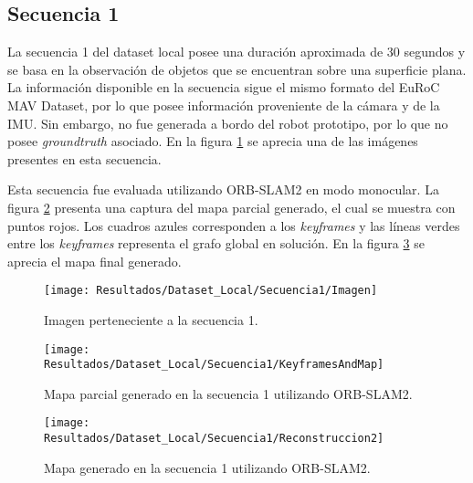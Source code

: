 \subsection{Secuencia 1}

La secuencia 1 del dataset local posee una duración aproximada de 30 segundos y se basa en la observación de objetos  que se encuentran sobre una superficie plana. La información disponible en la secuencia sigue el mismo formato del EuRoC MAV Dataset, por lo que posee información proveniente de la cámara y de la IMU. Sin embargo, no fue generada a bordo del robot prototipo, por lo que no posee \textit{groundtruth} asociado. En la figura \ref{imagen:Resultados/Dataset_Local/Secuencia1/Imagen} se aprecia una de las imágenes presentes en esta secuencia.

Esta secuencia fue evaluada utilizando ORB-SLAM2 en modo monocular. La figura \ref{imagen:Resultados/Dataset_Local/Secuencia1/KeyframesAndMap} presenta una captura del mapa parcial generado, el cual se muestra con puntos rojos. Los cuadros azules corresponden a los \textit{keyframes} y las líneas verdes entre los \textit{keyframes} representa el grafo global en solución. En la figura \ref{imagen:Resultados/Dataset_Local/Secuencia1/Reconstruccion2} se aprecia el mapa final generado.

 
\begin{figure}[H]
	\centering
	\texttt{[image: Resultados/Dataset\_Local/Secuencia1/Imagen]}
	\caption[Imagen perteneciente a la secuencia 1 del dataset local]{Imagen perteneciente a la secuencia 1.}
	\label{imagen:Resultados/Dataset_Local/Secuencia1/Imagen}
\end{figure}


\begin{figure}[H]
	\centering
	\texttt{[image: Resultados/Dataset\_Local/Secuencia1/KeyframesAndMap]}
	\caption[Mapa parcial generado en la secuencia 1 utilizando ORB-SLAM2]{Mapa parcial generado en la secuencia 1 utilizando ORB-SLAM2.}
	\label{imagen:Resultados/Dataset_Local/Secuencia1/KeyframesAndMap}
\end{figure}

\begin{figure}[H]
	\centering
	\texttt{[image: Resultados/Dataset\_Local/Secuencia1/Reconstruccion2]}
	\caption[Mapa generado en la secuencia 1 utilizando ORB-SLAM2]{Mapa generado en la secuencia 1 utilizando ORB-SLAM2.}
	\label{imagen:Resultados/Dataset_Local/Secuencia1/Reconstruccion2}
\end{figure}


